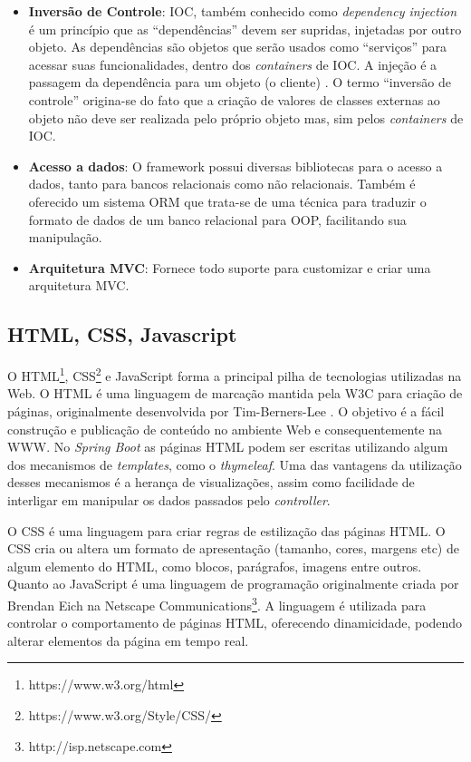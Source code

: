 \begin{itemize}
	\item{\textbf{Inversão de Controle}: \ac{IOC}, também conhecido como \textit{dependency injection} é um princípio que as “dependências” devem ser supridas, injetadas por outro objeto. As dependências são objetos que serão usados como “serviços” para acessar suas funcionalidades, dentro dos \textit{containers} de \ac{IOC}. A injeção é a passagem da dependência para um objeto (o cliente) \citep{DependencyInjection2006}. O termo “inversão de controle” origina-se do fato que a criação de valores de classes externas ao objeto não deve ser realizada pelo próprio objeto mas, sim pelos \textit{containers} de \ac{IOC}.}
	
	\item{\textbf{Acesso a dados}: O framework possui diversas bibliotecas para o acesso a dados, tanto para bancos relacionais como não relacionais. Também é oferecido um sistema \ac{ORM} que trata-se de uma técnica para traduzir o formato de dados de um banco relacional para \ac{OOP}, facilitando sua manipulação.}
	
	\item{\textbf{Arquitetura MVC}: Fornece todo suporte para customizar e criar uma arquitetura \ac{MVC}.}
\end{itemize}

\subsection{HTML, CSS, Javascript}

O HTML\footnote{https://www.w3.org/html}, \ac{CSS}\footnote{https://www.w3.org/Style/CSS/} e JavaScript forma a principal pilha de tecnologias utilizadas na Web. O HTML é uma linguagem de marcação mantida pela \ac{W3C} para criação de páginas, originalmente desenvolvida por Tim-Berners-Lee \citep{Raggett1998}. O objetivo é a fácil construção e publicação de conteúdo no ambiente Web e consequentemente na \ac{WWW}. No \textit{Spring Boot} as páginas HTML podem ser escritas utilizando algum dos mecanismos de \textit{templates}, como o \textit{thymeleaf}. Uma das vantagens da utilização desses mecanismos é a herança de visualizações, assim como facilidade de interligar em manipular os dados passados pelo \textit{controller}.

O \ac{CSS} é uma linguagem para criar regras de estilização das páginas \ac{HTML}. O CSS cria ou altera um formato de apresentação (tamanho, cores, margens etc) de algum elemento do HTML, como blocos, parágrafos, imagens entre outros. Quanto ao JavaScript é uma linguagem de programação originalmente criada por Brendan Eich na Netscape Communications\footnote{ http://isp.netscape.com}. A linguagem é utilizada para controlar o comportamento de páginas HTML, oferecendo dinamicidade, podendo alterar elementos da página em tempo real.

